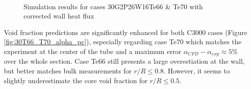 \begin{figure}[!h]
\centering
{}
\\
\caption{Simulation results for cases 30G2P26W16Te66 \& Te70 with corrected wall heat flux}
\label{fig:deb_cfd_30T66_T70_pc}
\end{figure}

\npar


Void fraction predictions are significantly enhanced for both C3000 cases (Figure \ref{fig:30T66_T70_alpha_pc}), especially regarding case Te70 which matches the experiment at the center of the tube and a maximum error $\alpha_{CFD} - \alpha_{exp} \approx 5\%$ over the whole section. Case Te66 still presents a large overestiation at the wall, but better matches bulk measurements for $r/R \leq 0.8$. However, it seems to slightly underestimate the core void fraction for $r/R \leq 0.5$.


